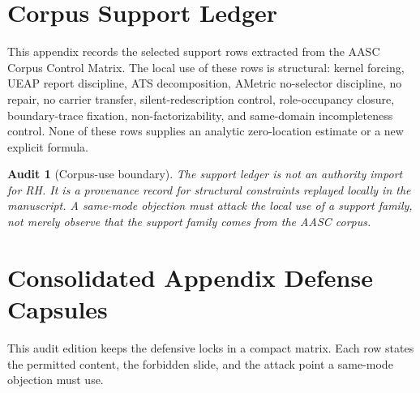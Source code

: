 \documentclass[11pt]{article}
\newtheorem{audit}{Audit}[section]
\begin{document}
\section{Corpus Support Ledger}\label{app:corpus}

This appendix records the selected support rows extracted from the AASC Corpus Control Matrix.  The local use of these rows is structural: kernel forcing, UEAP report discipline, ATS decomposition, AMetric no-selector discipline, no repair, no carrier transfer, silent-redescription control, role-occupancy closure, boundary-trace fixation, non-factorizability, and same-domain incompleteness control.  None of these rows supplies an analytic zero-location estimate or a new explicit formula.



\begin{audit}[Corpus-use boundary]
The support ledger is not an authority import for RH.  It is a provenance record for structural constraints replayed locally in the manuscript.  A same-mode objection must attack the local use of a support family, not merely observe that the support family comes from the AASC corpus.
\end{audit}


\newpage

\section{Consolidated Appendix Defense Capsules}\label{app:extendedcapsules}

This audit edition keeps the defensive locks in a compact matrix.  Each row states the permitted content, the forbidden slide, and the attack point a same-mode objection must use.
\end{document}
